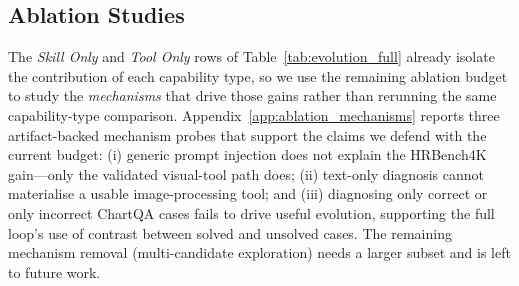 \subsection{Ablation Studies}
\label{sec:ablation}

The \emph{Skill Only} and \emph{Tool Only} rows of Table~\ref{tab:evolution_full} already
isolate the contribution of each capability type, so we use the remaining ablation budget
to study the \emph{mechanisms} that drive those gains rather than rerunning the same
capability-type comparison. Appendix~\ref{app:ablation_mechanisms} reports three
artifact-backed mechanism probes that support the claims we defend with the current
budget: (i) generic prompt injection does not explain the HRBench4K gain---only the
validated visual-tool path does; (ii) text-only diagnosis cannot materialise a usable
image-processing tool; and (iii) diagnosing only correct or only incorrect ChartQA cases
fails to drive useful evolution, supporting the full loop's use of contrast between
solved and unsolved cases. The remaining mechanism removal (multi-candidate exploration)
needs a larger subset and is left to future work.
